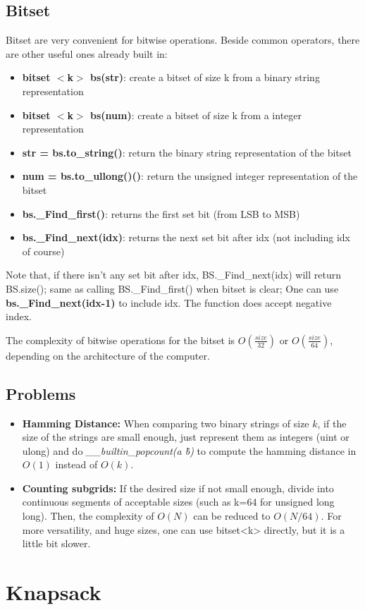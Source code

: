     \subsection{Bitset}

    Bitset are very convenient for bitwise operations. Beside common operators, there are other useful ones already built in:
    
    \begin{itemize} 
        \item \textbf{bitset $<$k$>$ bs(str)}: create a bitset of size k from a binary string representation
        \item \textbf{bitset $<$k$>$ bs(num)}: create a bitset of size k from a integer representation
        \item \textbf{str = bs.to\_string()}: return the binary string representation of the bitset
        \item \textbf{num = bs.to\_ullong()()}: return the unsigned integer representation of the bitset
        \item \textbf{bs.\_Find\_first()}: returns the first set bit (from LSB to MSB)
        \item \textbf{bs.\_Find\_next(idx)}: returns the next set bit after idx (not including idx of course)
    \end{itemize}

    Note that, if there isn't any set bit after idx, BS.\_Find\_next(idx) will return BS.size(); 
    same as calling BS.\_Find\_first() when bitset is clear;
    One can use \textbf{bs.\_Find\_next(idx-1)} to include idx. The function does accept negative index. 

    The complexity of bitwise operations for the bitset is $O(\frac{size}{32})$ or $O(\frac{size}{64})$, 
    depending on the architecture of the computer.
    
    \subsection{Problems}
    
    \begin{itemize}
        \item \textbf{Hamming Distance:} When comparing two binary strings of size $k$, if the size of the strings are small enough, 
        just represent them as integers (uint or ulong) and do \textit{\_\_builtin\_popcount(a \^ b)} to compute the hamming distance in $O(1)$ instead of $O(k)$.

        \item \textbf{Counting subgrids:} If the desired size if not small enough, divide into continuous segments of acceptable sizes (such as k=64 for unsigned long long).
        Then, the complexity of $O(N)$ can be reduced to $O(N/64)$. For more versatility, and huge sizes, one can use bitset<k> directly, but it is a little bit slower.

    \end{itemize}

\section{Knapsack}


